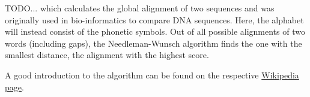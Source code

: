 TODO... which calculates the global alignment of two sequences and was originally used in bio-informatics to compare DNA sequences. Here, the alphabet will instead consist of the phonetic symbols. Out of all possible alignments of two words (including gaps), the Needleman-Wunsch algorithm finds the one with the smallest distance, \ie the alignment with the highest score.

A good introduction to the algorithm can be found on the respective \href{https://en.wikipedia.org/wiki/Needleman%E2%80%93Wunsch_algorithm}{Wikipedia page}.
